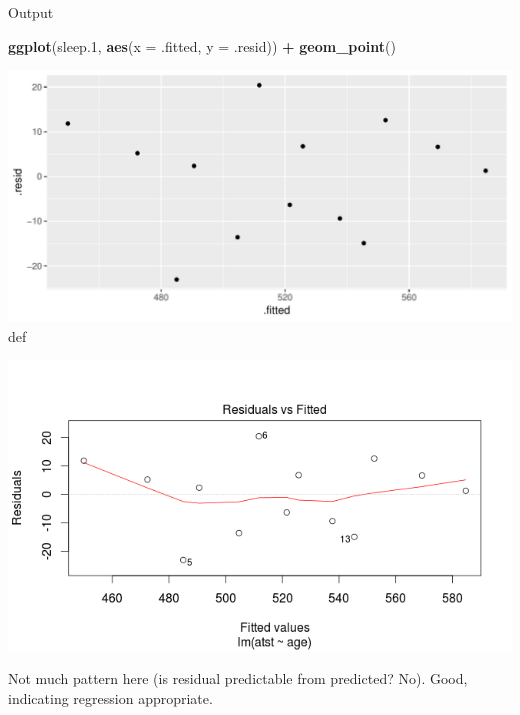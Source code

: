 \documentclass[ignorenonframetext,]{beamer}
\newenvironment{Shaded}{\begin{snugshade}}{\end{snugshade}}
\newcommand{\DataTypeTok}[1]{\textcolor[rgb]{0.13,0.29,0.53}{#1}}
\newcommand{\FloatTok}[1]{\textcolor[rgb]{0.00,0.00,0.81}{#1}}
\newcommand{\KeywordTok}[1]{\textcolor[rgb]{0.13,0.29,0.53}{\textbf{#1}}}
\newcommand{\NormalTok}[1]{#1}
\newcommand{\OperatorTok}[1]{\textcolor[rgb]{0.81,0.36,0.00}{\textbf{#1}}}
\newcommand{\StringTok}[1]{\textcolor[rgb]{0.31,0.60,0.02}{#1}}
\begin{document}
\begin{frame}[fragile]{Output}
\protect\hypertarget{output}{}

\begin{Shaded}
\begin{Highlighting}[]
\KeywordTok{ggplot}\NormalTok{(sleep}\FloatTok{.1}\NormalTok{, }\KeywordTok{aes}\NormalTok{(}\DataTypeTok{x =}\NormalTok{ .fitted, }\DataTypeTok{y =}\NormalTok{ .resid)) }\OperatorTok{+}\StringTok{ }\KeywordTok{geom_point}\NormalTok{()}
\end{Highlighting}
\end{Shaded}

\includegraphics{figure/akjhkadjfhjahnkkk-1.pdf} def

\includegraphics{sleep-resid.png}

Not much pattern here (is residual predictable from predicted? No).
Good, indicating regression appropriate.

\end{frame}
\end{document}
